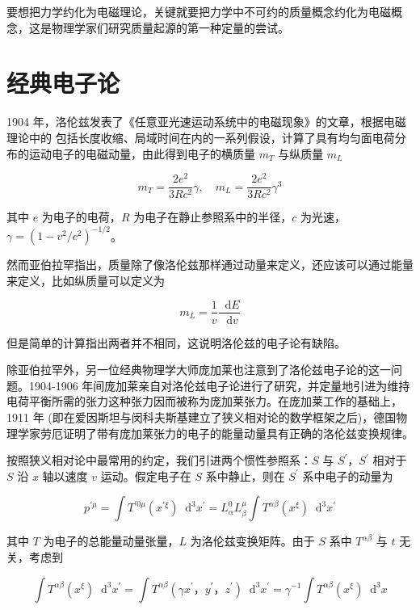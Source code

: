 \documentclass[oneside,a4paper,openany,11pt]{ctexbook}
\newcommand*{\dif}{\mathop{}\!\mathrm{d}} %
\begin{document}
要想把力学约化为电磁理论，关键就要把力学中不可约的质量概念约化为电磁概念，这是物理学家们研究质量起源的第一种定量的尝试。

\section{经典电子论}

1904 年，洛伦兹发表了《任意亚光速运动系统中的电磁现象》的文章，根据电磁理论中的
包括长度收缩、局域时间在内的一系列假设，计算了具有均匀面电荷分布的运动电子的电磁动量，由此得到电子的横质量 $m_T$ 与纵质量 $m_L$

\begin{equation}
    m_T = \frac{2 e^2}{3 R c^2} \gamma, \quad m_L = \frac{2 e^2}{3 R c^2} \gamma^3
\end{equation}

\noindent 其中 $e$ 为电子的电荷，$R$ 为电子在静止参照系中的半径，$c$ 为光速，$\gamma=(1-v^2/c^2)^{-1/2}$。

\noindent 然而亚伯拉罕指出，质量除了像洛伦兹那样通过动量来定义，还应该可以通过能量来定义，比如纵质量可以定义为

\begin{equation}
    m_L = \frac{1}{v} \frac{\dif E}{\dif v}
\end{equation}

但是简单的计算指出两者并不相同，这说明洛伦兹的电子论有缺陷。

除亚伯拉罕外，另一位经典物理学大师庞加莱也注意到了洛伦兹电子论的这一问题。1904-1906 年间庞加莱亲自对洛伦兹电子论进行了研究，并定量地引进为维持电荷平衡所需的张力这种张力因而被称为庞加莱张力。在庞加莱工作的基础上，1911 年 (即在爱因斯坦与闵科夫斯基建立了狭义相对论的数学框架之后)，德国物理学家劳厄证明了带有庞加莱张力的电子的能量动量具有正确的洛伦兹变换规律。

按照狭义相对论中最常用的约定，我们引进两个惯性参照系：$S$ 与 $S^\prime$，$S^\prime$ 相对于 $S$ 沿 $x$ 轴以速度 $v$ 运动。假定电子在 $S$ 系中静止，则在 $S^\prime$ 系中电子的动量为

\begin{equation}
    p^{\prime \mu} = \int T^{\prime 0\mu} (x^{\prime \xi}) \dif^3 x^\prime = L_\alpha^0 L_\beta^\mu \int T^{\alpha\beta} (x^{\xi}) \dif^3 x^\prime
\end{equation}

\noindent 其中 $T$ 为电子的总能量动量张量，$L$ 为洛伦兹变换矩阵。由于 $S$ 系中 $T^{\alpha\beta}$ 与 $t$ 无关，考虑到

\begin{equation}
    \int T^{\alpha\beta} (x^\xi) \dif^3 x^\prime = \int T^{\alpha\beta} (\gamma x^\prime，y^\prime，z^\prime) \dif^3 x^\prime = \gamma^{-1} \int T^{\alpha\beta} (x^\xi) \dif^3 x
\end{equation}
\end{document}
